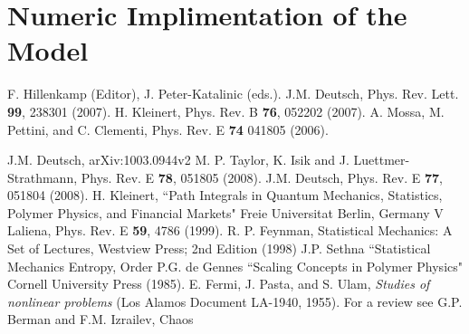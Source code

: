 \documentclass[pre,showpacs]{revtex4}
\begin{document}
\section{Numeric Implimentation of the Model}






\begin{thebibliography}{}
 F. Hillenkamp (Editor), J. Peter-Katalinic (eds.). 
 J.M. Deutsch, Phys. Rev. Lett. {\bf 99}, 238301 (2007).
 H. Kleinert, Phys. Rev. B {\bf76}, 052202 (2007). 
 A. Mossa, M. Pettini, and C. Clementi, Phys. Rev. E {\bf 74} 041805 (2006).

 J.M. Deutsch, arXiv:1003.0944v2 
 M. P. Taylor, K. Isik and J. Luettmer-Strathmann,  Phys. Rev. E {\bf 78}, 051805  (2008).
 J.M. Deutsch, Phys. Rev. E {\bf 77}, 051804 (2008).
 H. Kleinert, ``Path Integrals in Quantum Mechanics, Statistics, Polymer Physics, and Financial Markets" Freie Universitat Berlin, Germany
 V Laliena, Phys. Rev. E {\bf 59}, 4786 (1999).
 R. P. Feynman, Statistical Mechanics: A Set of Lectures, Westview Press; 2nd Edition (1998)
 J.P. Sethna ``Statistical Mechanics Entropy, Order
 P.G. de Gennes ``Scaling Concepts in Polymer Physics" Cornell University Press (1985).
 E. Fermi, J. Pasta, and S. Ulam, {\em Studies of nonlinear problems} 
(Los Alamos Document LA-1940, 1955).
 For a review see G.P. Berman and F.M. Izrailev, Chaos





\end{thebibliography}
\end{document}
